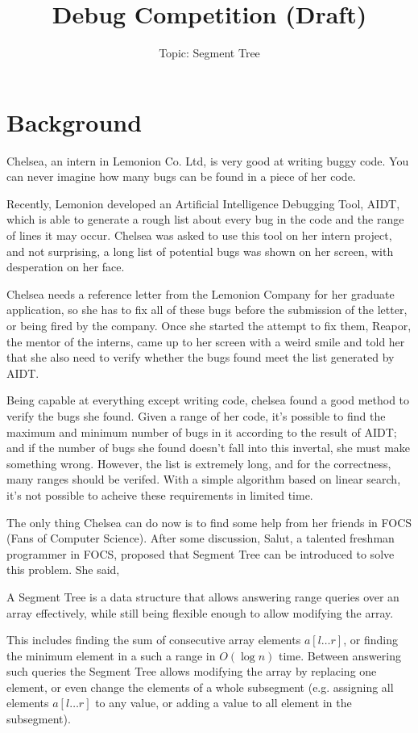 \documentclass[11pt,a4paper]{article}
\title{Debug Competition (Draft)}
\subtitle{Topic: Segment Tree}
\begin{document}
\maketitle

\section{Background}

Chelsea, an intern in Lemonion Co. Ltd, is very good at writing buggy code. You can never imagine how many bugs can be found in a piece of her code. \medskip

Recently, Lemonion developed an Artificial Intelligence Debugging Tool, AIDT, which is able to generate a rough list about every bug in the code and the range of lines it may occur. Chelsea was asked to use this tool on her intern project, and not surprising, a long list of potential bugs was shown on her screen, with desperation on her face. \medskip

Chelsea needs a reference letter from the Lemonion Company for her graduate application, so she has to fix all of these bugs before the submission of the letter, or being fired by the company. Once she started the attempt to fix them, Reapor, the mentor of the interns, came up to her screen with a weird smile and told her that she also need to verify whether the bugs found meet the list generated by AIDT. \medskip

Being capable at everything except writing code, chelsea found a good method to verify the bugs she found. Given a range of her code, it's possible to find the maximum and minimum number of bugs in it according to the result of AIDT; and if the number of bugs she found doesn't fall into this invertal, she must make something wrong. However, the list is extremely long, and for the correctness, many ranges should be verifed. With a simple algorithm based on linear search, it's not possible to acheive these requirements in limited time. \medskip

The only thing Chelsea can do now is to find some help from her friends in FOCS (Fans of Computer Science). After some discussion, Salut, a talented freshman programmer in FOCS, proposed that Segment Tree can be introduced to solve this problem. She said, \medskip

\begin{tcolorbox}[colback=blue!5!white,colframe=blue!75!black,title=Segment Tree]
	A Segment Tree\cite{segmenttree} is a data structure that allows answering range queries over an array effectively, while still being flexible enough to allow modifying the array. \medskip

	This includes finding the sum of consecutive array elements $a[l\dots r]$, or finding the minimum element in a such a range in $O(\log n)$ time. Between answering such queries the Segment Tree allows modifying the array by replacing one element, or even change the elements of a whole subsegment (e.g. assigning all elements $a[l\dots r]$ to any value, or adding a value to all element in the subsegment).
\end{tcolorbox}
\end{document}
